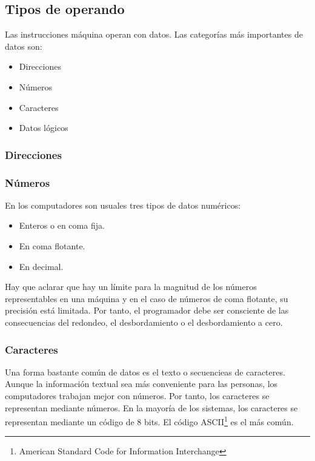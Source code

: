 \subsection{Tipos de operando}

Las instrucciones máquina operan con datos. Las categorías más importantes de datos son:

\begin{itemize}
  \item Direcciones
  \item Números 
  \item Caracteres
  \item Datos lógicos
\end{itemize}

\begin{subs}
  \subsubsection{Direcciones}

  \subsubsection{Números}

  En los computadores son usuales tres tipos de datos numéricos:

  \begin{itemize}
    \item Enteros o en coma fija.
    \item En coma flotante.
    \item En decimal.
  \end{itemize}

  Hay que aclarar que hay un límite para la magnitud de los números representables en una máquina y en el caso de números de coma flotante, su precisión está limitada. Por tanto, el programador debe ser consciente de las consecuencias del redondeo, el desbordamiento o el desbordamiento a cero.

  \subsubsection{Caracteres}

  Una forma bastante común de datos es el texto o secuencieas de caracteres. Aunque la información textual sea más conveniente para las personas, los computadores trabajan mejor con números. Por tanto, los caracteres se representan mediante números. En la mayoría de los sistemas, los caracteres se representan mediante un código de 8 bits. El código ASCII\footnote{American Standard Code for Information Interchange} es el más común.


\end{subs}

